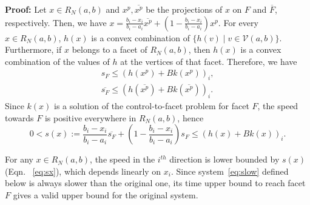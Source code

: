 \documentclass{ifacconf}
\newcommand{\VNset}{\mathcal{V}(a,b)}
\newcommand{\RNab}{R_N(a,b)}
\begin{document}
{\bf Proof:} \newcommand{\lambdaP}{\ensuremath{\frac{b_i - x_i}{b_i - a_i}}} 
Let $x \in \RNab$ and $x^p, \overline{x^p}$ be the projections of $x$ on $F$ and $\overline{F}$, respectively. Then, we have $x = \lambdaP \overline {x^p} + (1- \lambdaP) x^p$.  
For every $x \in \RNab$, $h(x)$ is a convex combination of 
  $\{h(v) \mid v \in \VNset \}$. Furthermore, if $x$ belongs to
  a facet of $\RNab$, then $h(x)$ is a convex combination of the
  values of $h$ at the vertices of that facet. 
  Therefore, we have
  \begin{align}
  	s_{F}  \leq (h(x^p) + Bk(x^p))_i, \\
  	\overline{s_F}  \leq (h(\overline{x^p}) + Bk(\overline{x^p}))_i. 
  \end{align}
  Since $k(x)$ is a solution of the control-to-facet problem for facet $F$, the speed towards $F$ is positive everywhere in $\RNab$, hence
  \begin{equation}\label{eq:sx}
  	0 < s(x) := \lambdaP \overline{s_F} + (1-\lambdaP) s_F \leq (h(x) + Bk(x))_i.
  \end{equation}

  For any $x \in \RNab$, the speed in the $i^{th}$ direction is lower bounded by $s(x)$ (Eqn. ~\eqref{eq:sx}), which depends linearly on $x_i$.  Since system~\eqref{eq:slow} 
 defined below is always slower than the original one, its time upper bound to reach facet $F$ gives a valid upper bound for the original system.
\end{document}

